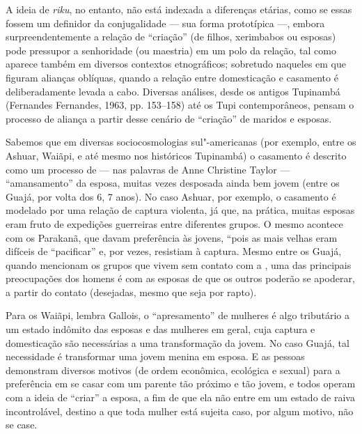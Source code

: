 A ideia de \emph{riku}, no entanto, não está indexada a diferenças
etárias, como se essas fossem um definidor da conjugalidade --- sua forma
prototípica ---, embora surpreendentemente a relação de ``criação'' (de
filhos, xerimbabos ou esposas) pode pressupor a senhoridade (ou
maestria) em um polo da relação, tal como aparece também em diversos
contextos etnográficos; sobretudo naqueles em que figuram alianças
oblíquas, quando a relação entre domesticação e casamento é
deliberadamente levada a cabo. Diversas análises, desde os antigos
Tupinambá (Fernandes Fernandes, 1963, pp. 153--158) até os Tupi
contemporâneos, pensam o processo de aliança a partir desse cenário de
``criação'' de maridos e esposas.

Sabemos que em diversas sociocosmologias sul"-americanas (por exemplo,
entre os Ashuar, Waiãpi, e até mesmo nos históricos Tupinambá) o
casamento é descrito como um processo de --- nas palavras de Anne
Christine Taylor --- ``amansamento'' da esposa, muitas vezes desposada
ainda bem jovem (entre os Guajá, por volta dos 6, 7 anos). No caso
Ashuar, por exemplo, o casamento é modelado por uma relação de captura
violenta, já que, na prática, muitas esposas eram fruto de expedições
guerreiras entre diferentes grupos. O mesmo acontece com os Parakanã,
que davam preferência às jovens, ``pois as mais velhas eram difíceis de
``pacificar'' e, por vezes, resistiam à captura. Mesmo entre os Guajá,
quando mencionam os grupos que vivem sem contato com a , uma das
principais preocupações dos homens é com as esposas de que os outros
poderão se apoderar, a partir do contato (desejadas, mesmo que seja por
rapto).

Para os Waiãpi, lembra Gallois, o ``apresamento'' de mulheres é algo
tributário a um estado indômito das esposas e das mulheres em geral,
cuja captura e domesticação são necessárias a uma transformação da
jovem. No caso Guajá, tal necessidade é transformar uma jovem menina em
esposa. E as pessoas demonstram diversos motivos (de ordem econômica,
ecológica e sexual) para a preferência em se casar com um parente tão
próximo e tão jovem, e todos operam com a ideia de ``criar'' a esposa, a
fim de que ela não entre em um estado de raiva incontrolável, destino a
que toda mulher está sujeita caso, por algum motivo, não se case.

